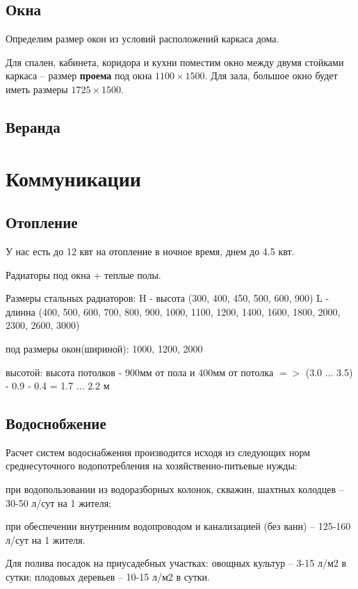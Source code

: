 \documentclass[10pt, twocolumn]{report}
\newenvironment{itemize*}%
{\begin{itemize}%
	\setlength{\itemsep}{1pt}%
	\setlength{\parskip}{1pt}}%
{\end{itemize}}
\begin{document}
\chapter{Окна}

Определим размер окон из условий расположений каркаса дома.

Для спален, кабинета, коридора и кухни поместим окно между двумя стойками каркаса -- размер \textbf{проема} под окна $1100 \times 1500$. Для зала, большое окно будет иметь размеры $1725 \times 1500$. 

\chapter{Веранда}

\part{Коммуникации}

\chapter{Отопление}
У нас есть до 12 квт на отопление в ночное время, днем до 4.5 квт.

Радиаторы под окна + теплые полы.

Размеры стальных радиаторов:
H - высота (300, 400, 450, 500, 600, 900)
L - длинна (400, 500, 600, 700, 800, 900, 1000, 1100, 1200, 1400, 1600, 1800, 2000, 2300, 2600, 3000)

под размеры окон(шириной): 1000, 1200, 2000

высотой: высота потолков - 900мм от пола и 400мм от потолка $=>$ (3.0 ... 3.5) - 0.9 - 0.4 = 1.7 ... 2.2 м

\chapter{Водоснобжение}
Расчет систем водоснабжения производится исходя из следующих норм среднесуточного водопотребления на хозяйственно-питьевые нужды:

\begin{itemize*}
	\item при водопользовании из водоразборных колонок, скважин, шахтных колодцев -- 30-50 л/сут на 1 жителя;
	\item при обеспечении внутренним водопроводом и канализацией (без ванн) -- 125-160 л/сут на 1 жителя.
	\item Для полива посадок на приусадебных участках: овощных культур -- 3-15 л/м2 в сутки; плодовых деревьев -- 10-15 л/м2 в сутки.
\end{itemize*}
\end{document}
